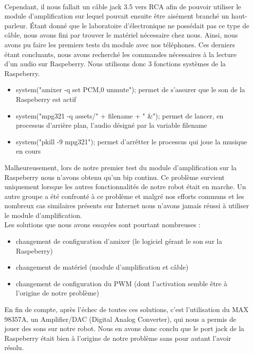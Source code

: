 \documentclass[a4paper, 12pt]{report}
\begin{document}
\\
Cependant, il nous fallait un câble jack 3.5 vers RCA afin de pouvoir utiliser le module d'amplification sur lequel pouvait ensuite être aisément branché un haut-parleur. Étant donné que le laboratoire d'électronique ne possédait pas ce type de câble, nous avons fini par trouver le matériel nécessaire chez nous. Ainsi, nous avons pu faire les premiers tests du module avec nos téléphones. Ces derniers étant concluants, nous avons recherché les commandes nécessaires à la lecture d'un audio sur Raspeberry. Nous utilisons donc 3 fonctions systèmes
de la Raspeberry.
\begin{itemize}
    \item system("amixer -q set PCM,0 unmute"); permet de s'assurer que le son de la Raspeberry est actif
    \item system("mpg321 -q assets/" + filename + " \&"); permet de lancer, en processus d'arrière plan, l'audio désigné par la variable filename
    \item system("pkill -9 mpg321"); permet d'arrêtter le processus qui joue la musique en cours
\end{itemize}
Malheureusement, lors de notre premier test du module d'amplification sur la Raspeberry nous n'avons obtenu qu'un bip continu. Ce problème survient uniquement lorsque les autres fonctionnalités  de notre robot était en marche. Un autre groupe a été confronté à ce problème et malgré nos efforts communs et les nombreux cas similaires présents sur Internet nous n'avons jamais réussi à utiliser le module d'amplification.
\\
Les solutions que nous avons essayées sont pourtant nombreuses :
\begin{itemize}
    \item changement de configuration d'amixer (le logiciel gérant le son sur la Raspeberry)
    \item changement de matériel (module d'amplification et câble)
    \item changement de configuration du PWM (dont l'activation semble être à l'origine de notre problème)
\end{itemize}
En fin de compte, après l'échec de toutes ces solutions, c'est l'utilisation du MAX 98357A, un Amplifier/DAC (Digital Analog Converter), qui nous a permis de jouer des sons sur notre robot. Nous en avons donc conclu que le port jack de la Raspeberry était bien à l'origine de notre problème sans pour autant l'avoir résolu.
\end{document}
